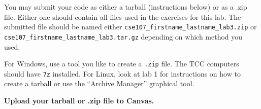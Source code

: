 \documentclass[11pt]{cselabheader}
\begin{document}
You may submit your code as either a tarball (instructions below) or as a .zip
file. Either one should contain all files used in the exercises for this lab.
The submitted file should be named either
\texttt{cse107\_firstname\_lastname\_lab3.zip} or
\texttt{cse107\_firstname\_lastname\_lab3.tar.gz} depending on which method you
used.

For Windows, use a tool you like to create a \texttt{.zip} file. The TCC computers should
have \texttt{7z} installed. For Linux, look at lab 1 for instructions on how to
create a tarball or use the ``Archive Manager'' graphical tool.

\begin{center}
  \textbf{Upload your tarball or .zip file to Canvas.}
\end{center}
\end{document}
